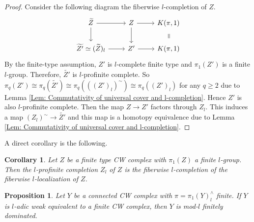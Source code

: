 \documentclass[11pt]{amsart}
\newtheorem{proposition}[theorem]{Proposition}
\newtheorem{corollary}[theorem]{Corollary}
\theoremstyle{definition}
\numberwithin{equation}{section}
\numberwithin{equation}{section}
\begin{document}
\begin{proof}
Consider the following diagram the fiberwise $l$-completion of $Z$.
\[
\begin{tikzcd}
   \widetilde{Z} \arrow[r] \arrow[d] &  Z \arrow[r] \arrow[d] & K(\pi,1) \arrow[d,phantom, sloped, "="] \\
   \widetilde{Z'}\simeq(\widetilde{Z})_l \arrow[r] &  Z' \arrow[r] & K(\pi,1)
\end{tikzcd}
\]
By the finite-type assumption, $Z'$ is $l$-complete finite type and $\pi_1(Z')$ is a finite $l$-group. Therefore, $\widetilde{Z'}$ is $l$-profinite complete. So $\pi_q(Z')\cong \pi_q(\widetilde{Z'})\cong \pi_q(((Z')_l)^{\sim})\cong \pi_q((Z')_l)$ for any $q\geq 2$ due to Lemma \ref{Lem: Commutativity of universal cover and l-completion}.
Hence $Z'$ is also $l$-profinite complete. Then the map $Z\rightarrow Z'$ factors through $Z_l$. This induces a map $(Z_l)^{\sim}\rightarrow \widetilde{Z'}$ and this map is a homotopy equivalence due to Lemma \ref{Lem: Commutativity of universal cover and l-completion}. 
\end{proof}

A direct corollary is the following.

\begin{corollary}\label{Cor: completion = fiberwise completion + localization}
Let $Z$ be a finite type CW complex with $\pi_1(Z)$ a finite $l$-group. Then the $l$-profinite completion $Z_l$ of $Z$ is the fiberwise $l$-completion of the fiberwise $l$-localization of $Z$. 
\end{corollary}

\begin{proposition}\label{Lemma: a necessary condition for finiteness obstruction}
Let $Y$ be a connected CW complex with $\pi=\pi_1(Y)^{\wedge}_l$ finite. If $Y$ is $l$-adic weak equivalent to a finite CW complex, then $Y$ is mod-$l$ finitely dominated.  
\end{proposition}
\end{document}
